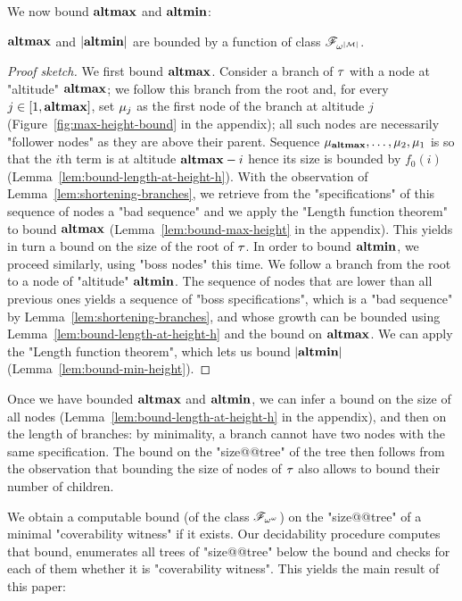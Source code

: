 We now bound $\mathbf{altmax}$ and $\mathbf{altmin}$:
\begin{lemma}
$\mathbf{altmax}$ and $|\mathbf{altmin}|$ are bounded by a function of class $\mathscr{F}_{\omega^{|\mathcal{M}|}}$. 
\end{lemma}
\begin{proof}[Proof sketch]
We first bound $\mathbf{altmax}$. Consider a branch of $\tau$ with a node at "altitude" $\mathbf{altmax}$; we follow this branch from the root and, for every $j \in [1,\mathbf{altmax}]$, set $\mu_{j}$ as the first node of the branch at altitude $j$ (Figure~\ref{fig:max-height-bound} in the appendix); all such nodes are necessarily "follower nodes" as they are above their parent. Sequence $\mu_{\mathbf{altmax}}, \dots, \mu_2, \mu_1$ is so that the $i$th term is at altitude $\mathbf{altmax}-i$ hence its size is bounded by $f_0(i)$ (Lemma~\ref{lem:bound-length-at-height-h}). With the observation of Lemma~\ref{lem:shortening-branches}, we retrieve from the "specifications" of this sequence of nodes a "bad sequence" and we apply the "Length function theorem" to bound $\mathbf{altmax}$ (Lemma~\ref{lem:bound-max-height} in the appendix).
This yields in turn a bound on the size of the root of $\tau$. In order to bound $\mathbf{altmin}$, we proceed similarly, using "boss nodes" this time. We follow a branch from the root to a node of "altitude" $\mathbf{altmin}$. The sequence of nodes that are lower than all previous ones yields a sequence of "boss specifications", which is a "bad sequence" by Lemma~\ref{lem:shortening-branches}, and whose growth can be bounded using Lemma~\ref{lem:bound-length-at-height-h} and the bound on $\mathbf{altmax}$. We can apply the "Length function theorem", which lets us bound $|\mathbf{altmin}|$ (Lemma~\ref{lem:bound-min-height}).
\end{proof}

Once we have bounded $\mathbf{altmax}$ and $\mathbf{altmin}$, we can infer a bound on the size of all nodes (Lemma~\ref{lem:bound-length-at-height-h} in the appendix), and then on the length of branches: by minimality, a branch cannot have two nodes with the same specification. 
The bound on the "size@@tree" of the tree then follows from the observation that bounding the size of nodes of $\tau$ also allows to bound their number of children.
 



We obtain a computable bound (of the class $\mathscr{F}_{\omega^\omega}$) on the "size@@tree" of a minimal "coverability witness" if it exists. 
Our decidability procedure computes that bound, enumerates all trees of "size@@tree" below the bound and checks for each of them whether it is "coverability witness". This yields the main result of this paper:

\decidablecover*


